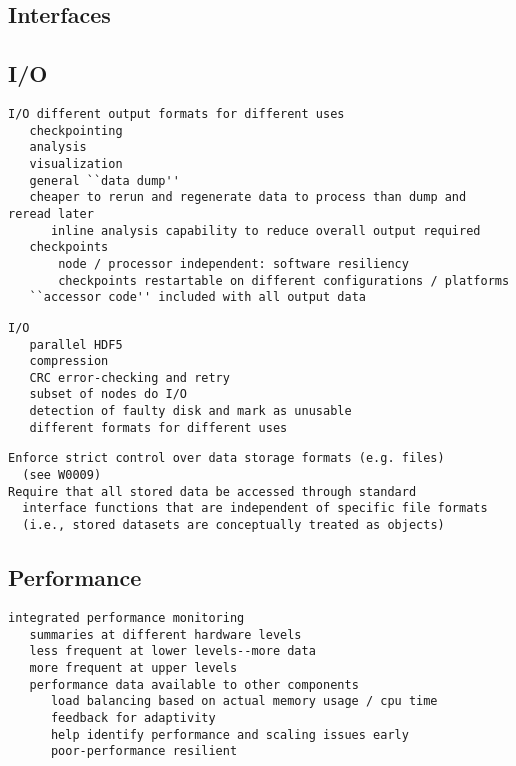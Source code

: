 \documentclass[10pt]{article}
\begin{document}
\subsection{Interfaces} \label{ss:design-interfaces}

\subsection{I/O} \label{ss:design-io}


\begin{verbatim}
I/O different output formats for different uses
   checkpointing
   analysis
   visualization
   general ``data dump''
   cheaper to rerun and regenerate data to process than dump and reread later
      inline analysis capability to reduce overall output required
   checkpoints
       node / processor independent: software resiliency
       checkpoints restartable on different configurations / platforms
   ``accessor code'' included with all output data
\end{verbatim}
\begin{verbatim}
I/O
   parallel HDF5
   compression
   CRC error-checking and retry
   subset of nodes do I/O
   detection of faulty disk and mark as unusable
   different formats for different uses
\end{verbatim}

\begin{verbatim}
Enforce strict control over data storage formats (e.g. files)
  (see W0009)
Require that all stored data be accessed through standard
  interface functions that are independent of specific file formats
  (i.e., stored datasets are conceptually treated as objects)
\end{verbatim}

\subsection{Performance} \label{ss:design-performance}

\begin{verbatim}
integrated performance monitoring
   summaries at different hardware levels
   less frequent at lower levels--more data
   more frequent at upper levels
   performance data available to other components
      load balancing based on actual memory usage / cpu time
      feedback for adaptivity
      help identify performance and scaling issues early
      poor-performance resilient
\end{verbatim}
\end{document}
